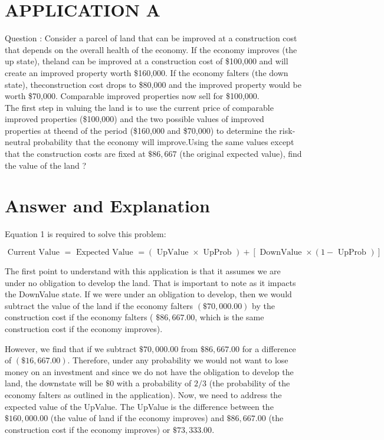\documentclass[11pt]{article}
\begin{document}
\section*{APPLICATION A}
Question : Consider a parcel of land that can be improved at a construction cost that depends on the overall health of the economy. If the economy improves (the up state), theland can be improved at a construction cost of \$100,000 and will create an improved property worth \$160,000. If the economy falters (the down state), theconstruction cost drops to \$80,000 and the improved property would be worth \$70,000. Comparable improved properties now sell for \$100,000.\\
The first step in valuing the land is to use the current price of comparable improved properties (\$100,000) and the two possible values of improved properties at theend of the period (\$160,000 and \$70,000) to determine the risk-neutral probability that the economy will improve.Using the same values except that the construction costs are fixed at $\$ 86,667$ (the original expected value), find the value of the land ?

\section*{Answer and Explanation}
Equation 1 is required to solve this problem:

$$
\text { Current Value }=\text { Expected Value }=(\text { UpValue } \times \text { UpProb })+[\text { DownValue } \times(1-\text { UpProb })]
$$

The first point to understand with this application is that it assumes we are under no obligation to develop the land. That is important to note as it impacts the DownValue state. If we were under an obligation to develop, then we would subtract the value of the land if the economy falters $(\$ 70,000.00)$ by the construction cost if the economy falters ( $\$ 86,667.00$, which is the same construction cost if the economy improves).

However, we find that if we subtract $\$ 70,000.00$ from $\$ 86,667.00$ for a difference of $(\$ 16,667.00)$. Therefore, under any probability we would not want to lose money on an investment and since we do not have the obligation to develop the land, the downstate will be $\$ 0$ with a probability of $2 / 3$ (the probability of the economy falters as outlined in the application). Now, we need to address the expected value of the UpValue. The UpValue is the difference between the $\$ 160,000.00$ (the value of land if the economy improves) and $\$ 86,667.00$ (the construction cost if the economy improves) or $\$ 73,333.00$.
\end{document}
